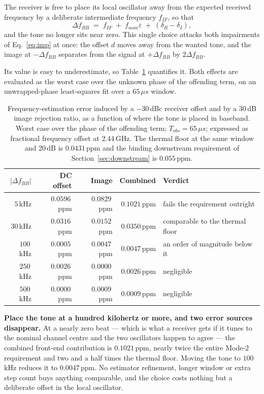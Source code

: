 \documentclass[11pt,a4paper]{article}
\newcommand{\us}{\,\ensuremath{\upmu}s}
\providecommand{\upmu}{\mu}
\begin{document}
The receiver is free to place its local oscillator away from the expected received frequency by a
deliberate intermediate frequency $f_{IF}$, so that
\begin{equation}
\Delta f_{BB} \;=\; f_{IF} \;+\; f_{nom}\varepsilon \;+\; (\delta_R-\delta_I) ,
\label{eq:if}
\end{equation}
and the tone no longer sits near zero. This single choice attacks both impairments of
Eq.~\eqref{eq:imp} at once: the offset $d$ moves away from the wanted tone, and the image at
$-\Delta f_{BB}$ separates from the signal at $+\Delta f_{BB}$ by $2\Delta f_{BB}$.

Its value is easy to underestimate, so Table~\ref{tab:ifplace} quantifies it. Both effects are
evaluated as the worst case over the unknown phase of the offending term, on an unwrapped-phase
least-squares fit over a $65\us$ window.

\begin{table}[h]
\caption{Frequency-estimation error induced by a $-30$\,dBc receiver offset and by a 30\,dB image
rejection ratio, as a function of where the tone is placed in baseband. Worst case over the phase of
the offending term; $T_{obs}=65\us$; expressed as fractional frequency offset at 2.44\,GHz. The
thermal floor at the same window and 20\,dB is $0.0431$\,ppm and the binding downstream requirement
of Section~\ref{sec:downstream} is $0.055$\,ppm.}
\label{tab:ifplace}
\centering\small
\begin{tabular}{@{}rrrrl@{}}
\toprule
$|\Delta f_{BB}|$ & DC offset & Image & Combined & Verdict \\
\midrule
$5$\,kHz   & $0.0596$\,ppm & $0.0829$\,ppm & $0.1021$\,ppm & fails the requirement outright \\
$30$\,kHz  & $0.0316$\,ppm & $0.0152$\,ppm & $0.0350$\,ppm & comparable to the thermal floor \\
$100$\,kHz & $0.0005$\,ppm & $0.0047$\,ppm & $0.0047$\,ppm & an order of magnitude below it \\
$250$\,kHz & $0.0026$\,ppm & $0.0000$\,ppm & $0.0026$\,ppm & negligible \\
$500$\,kHz & $0.0000$\,ppm & $0.0009$\,ppm & $0.0009$\,ppm & negligible \\
\bottomrule
\end{tabular}
\end{table}

\begin{callout}
\textbf{Place the tone at a hundred kilohertz or more, and two error sources disappear.} At a nearly
zero beat --- which is what a receiver gets if it tunes to the nominal channel centre and the two
oscillators happen to agree --- the combined front-end contribution is $0.1021$\,ppm, nearly twice
the entire Mode-2 requirement and two and a half times the thermal floor. Moving the tone to
$100$\,kHz reduces it to $0.0047$\,ppm. No estimator refinement, longer window or extra step count
buys anything comparable, and the choice costs nothing but a deliberate offset in the local
oscillator.
\end{callout}
\end{document}

